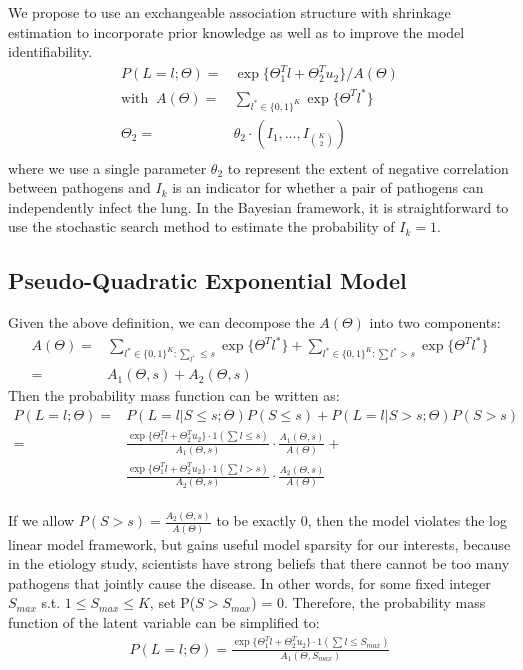 \documentclass[11 pt, a4paper]{article}  %
\begin{document}
We propose to use an exchangeable association structure with shrinkage estimation to incorporate prior knowledge as well as to improve the model identifiability.
\begin{align}
P(L=l; \Theta) = & \exp \{\Theta_1^T l + \Theta_2^{T} u_2 \}/ A(\Theta) \\ 
\text{with }\                                                   \nonumber
A(\Theta) = & \sum_{l^* \in \{0,1\}^K}\exp \{ \Theta^T l^*\} \\ \nonumber
\Theta_2 = & \theta_2 \cdot (I_1, \ldots, I_{{K \choose 2}}) \\ \nonumber
\end{align}
where we use a single parameter $\theta_2$ to represent the extent of negative correlation between pathogens and $I_k$ is an indicator for whether a pair of pathogens can independently infect the lung. In the Bayesian framework, it is straightforward to use the stochastic search method to estimate the probability of $I_k = 1$.


\subsection{Pseudo-Quadratic Exponential Model}
Given the above definition, we can decompose the $A(\Theta)$ into two components: 
\begin{align*}
A(\Theta) = & \sum_{l^* \in \{0,1\}^K : \sum_{l^*} \leq s}\exp \{ \Theta^T l^*\} +
\sum_{l^* \in \{0,1\}^K : \sum{l^*} > s}\exp \{ \Theta^T l^*\} \\
= & A_1(\Theta, s) + A_2(\Theta, s)
\end{align*}
Then the probability mass function can be written as:
\begin{align*}
P(L=l; \Theta) = & P(L=l | S \leq s; \Theta) P(S \leq s) + P(L=l | S > s; \Theta) P(S > s)\\
= & \frac{\exp \{\Theta_1^T l + \Theta_2^{T} u_2 \} \cdot 1(\sum l \leq s)}{A_1(\Theta, s)} \cdot \frac{A_1(\Theta, s)}{A(\Theta)} +\\
& \frac{\exp \{\Theta_1^T l + \Theta_2^{T} u_2 \} \cdot 1(\sum l > s)}{A_2(\Theta, s )} \cdot \frac{A_2(\Theta, s)}{A(\Theta)}
\end{align*}
\\
If we allow $P(S > s) = \frac{A_2(\Theta, s)}{A(\Theta)}$ to be exactly 0, then the model violates the log linear model framework, but gains useful model sparsity for our interests, because in the etiology study, scientists have strong beliefs that there cannot be too many pathogens that jointly cause the disease. In other words, for some fixed integer $S_{max}$ s.t. $1\leq S_{max} \leq K$, set P($S > S_{max}$) = 0. Therefore, the probability mass function of the latent variable can be simplified to: 
\begin{align}
P(L=l; \Theta) = \frac{\exp \{\Theta_1^T l + \Theta_2^{T} u_2 \} \cdot 1(\sum l \leq S_{max})}{A_1(\Theta, S_{max})} 
\end{align}
\end{document}
